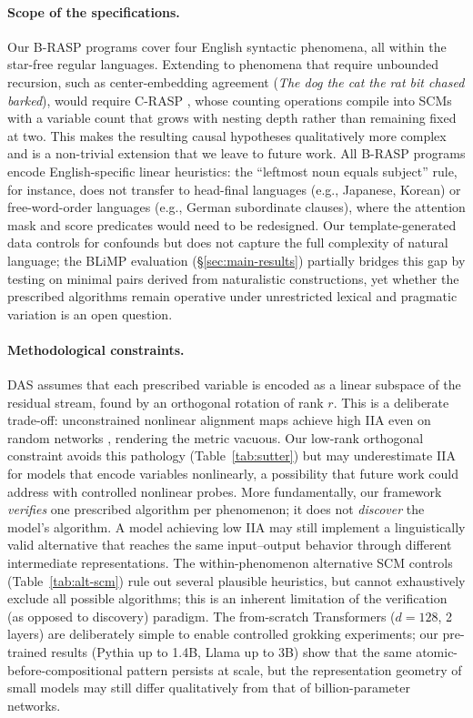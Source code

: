 \documentclass[11pt]{article}
\begin{document}
\paragraph{Scope of the specifications.}
Our B-RASP programs cover four English syntactic phenomena, all within the star-free regular languages.
Extending to phenomena that require unbounded recursion, such as center-embedding agreement (\textit{The dog the cat the rat bit chased barked}), would require C-RASP \citep{DBLP:conf/nips/YangCCN25}, whose counting operations compile into SCMs with a variable count that grows with nesting depth rather than remaining fixed at two.
This makes the resulting causal hypotheses qualitatively more complex and is a non-trivial extension that we leave to future work.
All B-RASP programs encode English-specific linear heuristics: the ``leftmost noun equals subject'' rule, for instance, does not transfer to head-final languages (e.g., Japanese, Korean) or free-word-order languages (e.g., German subordinate clauses), where the attention mask and score predicates would need to be redesigned.
Our template-generated data controls for confounds but does not capture the full complexity of natural language; the BLiMP evaluation (\S\ref{sec:main-results}) partially bridges this gap by testing on minimal pairs derived from naturalistic constructions, yet whether the prescribed algorithms remain operative under unrestricted lexical and pragmatic variation is an open question.

\paragraph{Methodological constraints.}
DAS assumes that each prescribed variable is encoded as a linear subspace of the residual stream, found by an orthogonal rotation of rank $r$.
This is a deliberate trade-off: unconstrained nonlinear alignment maps achieve high IIA even on random networks \citep{sutter2025nonlinear}, rendering the metric vacuous.
Our low-rank orthogonal constraint avoids this pathology (Table~\ref{tab:sutter}) but may underestimate IIA for models that encode variables nonlinearly, a possibility that future work could address with controlled nonlinear probes.
More fundamentally, our framework \emph{verifies} one prescribed algorithm per phenomenon; it does not \emph{discover} the model's algorithm.
A model achieving low IIA may still implement a linguistically valid alternative that reaches the same input--output behavior through different intermediate representations.
The within-phenomenon alternative SCM controls (Table~\ref{tab:alt-scm}) rule out several plausible heuristics, but cannot exhaustively exclude all possible algorithms; this is an inherent limitation of the verification (as opposed to discovery) paradigm.
The from-scratch Transformers ($d{=}128$, 2 layers) are deliberately simple to enable controlled grokking experiments; our pre-trained results (Pythia up to 1.4B, Llama up to 3B) show that the same atomic-before-compositional pattern persists at scale, but the representation geometry of small models may still differ qualitatively from that of billion-parameter networks.
\end{document}
